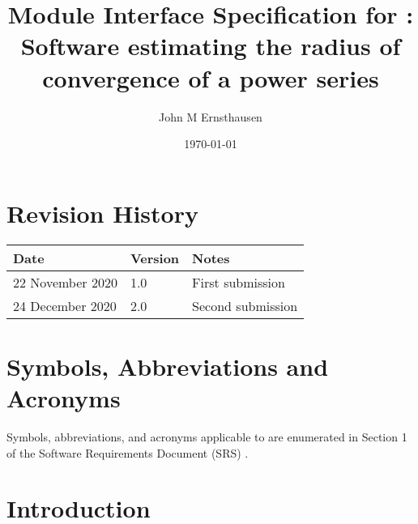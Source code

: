 \documentclass[12pt, titlepage]{article}
\begin{document}
\title{Module Interface Specification for : Software estimating the radius of convergence of
a power series}
\author{John M Ernsthausen}
\date{\today}

\maketitle


\section{Revision History}

\begin{tabularx}{\textwidth}{p{4cm}p{2cm}X}
\toprule {\bf Date} & {\bf Version} & {\bf Notes}\\
\midrule
  22 November 2020 & 1.0 & First submission\\
  24 December 2020 & 2.0 & Second submission\\
\bottomrule
\end{tabularx}

\newpage

\section{Symbols, Abbreviations and Acronyms}

Symbols, abbreviations, and acronyms applicable to  are enumerated
in Section 1 of the Software Requirements Document (SRS) \citep{SRS}.

\newpage

\tableofcontents

\newpage


\section{Introduction}
\end{document}
